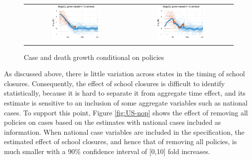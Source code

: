 \documentclass[11pt,reqno,letter]{amsart}
\theoremstyle{definition}
\begin{document}
\begin{figure}
  \caption{Case and death growth conditional on policies \label{fig:growthpolicies1}}
  \begin{minipage}{\linewidth}
    \centering
    \begin{tabular}{cc}
       \includegraphics[width=0.483\textwidth]{tables_and_figures/pk12-cases}
      &
        \includegraphics[width=0.483\textwidth]{tables_and_figures/pk12-deaths}
    \end{tabular}
  \end{minipage}
\end{figure}


As discussed above, there is little variation across states
in the timing of school closures. Consequently, the effect of school
closures is difficult to identify statistically, because it is hard to separate it from aggregate time effect, and its estimate is sensitive to an inclusion of some aggregate variables such as national cases. To support this point, Figure \ref{fig:US-nop} shows the
effect of removing all policies on cases based on the estimates with national cases
included as information. When national case variables are included
in the specification, the estimated effect of school closures, and hence that of removing all
policies, is much smaller with a 90\% confidence interval of [0,10] fold increases.
\end{document}

